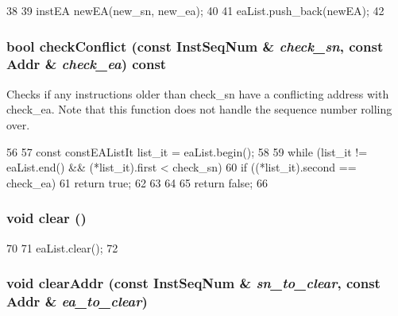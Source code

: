 \begin{DoxyCode}
38 {
39     instEA newEA(new_sn, new_ea);
40 
41     eaList.push_back(newEA);
42 }
\end{DoxyCode}
\hypertarget{classEAList_a26a0f8ba9b35435ae8d4486031ef1752}{
\subsubsection[{checkConflict}]{\setlength{\rightskip}{0pt plus 5cm}bool checkConflict (const {\bf InstSeqNum} \& {\em check\_\-sn}, \/  const {\bf Addr} \& {\em check\_\-ea}) const}}
\label{classEAList_a26a0f8ba9b35435ae8d4486031ef1752}
Checks if any instructions older than check\_\-sn have a conflicting address with check\_\-ea. Note that this function does not handle the sequence number rolling over. 


\begin{DoxyCode}
56 {
57     const constEAListIt list_it = eaList.begin();
58 
59     while (list_it != eaList.end() && (*list_it).first < check_sn) {
60         if ((*list_it).second == check_ea) {
61             return true;
62         }
63     }
64 
65     return false;
66 }
\end{DoxyCode}
\hypertarget{classEAList_ac8bb3912a3ce86b15842e79d0b421204}{
\subsubsection[{clear}]{\setlength{\rightskip}{0pt plus 5cm}void clear ()}}
\label{classEAList_ac8bb3912a3ce86b15842e79d0b421204}



\begin{DoxyCode}
70 {
71     eaList.clear();
72 }
\end{DoxyCode}
\hypertarget{classEAList_aa81385e8b59673c83884a6e3ad77db9a}{
\subsubsection[{clearAddr}]{\setlength{\rightskip}{0pt plus 5cm}void clearAddr (const {\bf InstSeqNum} \& {\em sn\_\-to\_\-clear}, \/  const {\bf Addr} \& {\em ea\_\-to\_\-clear})}}
\label{classEAList_aa81385e8b59673c83884a6e3ad77db9a}



